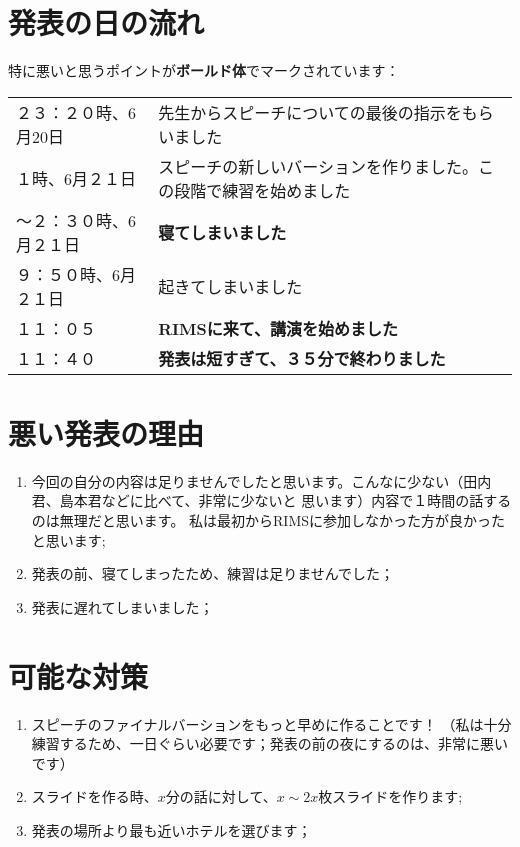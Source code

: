 \documentclass[12pt]{article} %
\begin{document}
\section{発表の日の流れ}
特に悪いと思うポイントが\textbf{ボールド体}でマークされています：
\begin{center}
	\begin{tabular}[]{lp{}}
		２３：２０時、6月20日&先生からスピーチについての最後の指示をもらいました\\
		１時、6月２１日&スピーチの新しいバーションを作りました。この段階で練習を始めました\\
		〜２：３０時、6月２１日&{\bf 寝てしまいました}\\
		９：５０時、6月２１日&起きてしまいました\\
		１１：０５&{\bf RIMSに来て、講演を始めました}\\
		１１：４０&{\bf 発表は短すぎて、３５分で終わりました}\\
	\end{tabular}
\end{center}
\section{悪い発表の理由}
\begin{enumerate}
	\item 今回の自分の内容は足りませんでしたと思います。こんなに少ない（田内君、島本君などに比べて、非常に少ないと
		思います）内容で１時間の話するのは無理だと思います。
		私は最初からRIMSに参加しなかった方が良かったと思います;

	\item 発表の前、寝てしまったため、練習は足りませんでした；
	\item 発表に遅れてしまいました；
\end{enumerate}
\section{可能な対策}
\begin{enumerate}
	\item スピーチのファイナルバーションをもっと早めに作ることです！
		（私は十分練習するため、一日ぐらい必要です；発表の前の夜にするのは、非常に悪いです）
	\item スライドを作る時、$x$分の話に対して、$x
		\sim{2x}$枚スライドを作ります;
	\item 発表の場所より最も近いホテルを選びます；
\end{enumerate}
\end{document}
